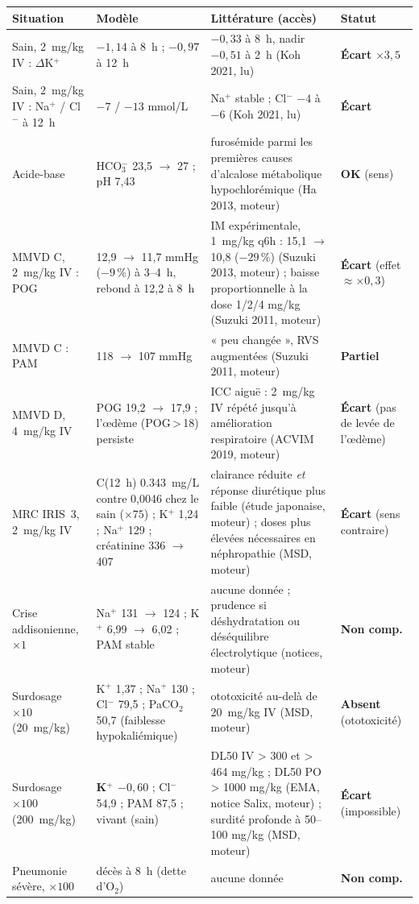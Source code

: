 \documentclass[10pt,a4paper]{article}
\newcommand{\ok}{\textcolor{green!45!black}{\textbf{OK}}}
\newcommand{\ecart}{\textcolor{red!70!black}{\textbf{Écart}}}
\newcommand{\partiel}{\textcolor{orange!80!black}{\textbf{Partiel}}}
\newcommand{\nc}{\textcolor{black!60}{\textbf{Non comp.}}}
\newcommand{\absent}{\textcolor{red!70!black}{\textbf{Absent}}}
\begin{document}
\begin{tabularx}{\linewidth}{@{}P{3.4cm}P{4.3cm}LP{1.8cm}@{}}
\toprule
Situation & Modèle & Littérature (accès) & Statut\\
\midrule\endhead
Sain, \SI{2}{mg/kg} IV : $\Delta$K$^+$ & $-1{,}14$ à 8~h ; $-0{,}97$ à 12~h & $-0{,}33$ à 8~h, nadir $-0{,}51$ à 2~h (Koh 2021, lu) & \ecart{} $\times 3{,}5$\\
Sain, \SI{2}{mg/kg} IV : Na$^+$ / Cl$^-$ à 12~h & $-7$ / $-13$ mmol/L & Na$^+$ stable ; Cl$^-$ $-4$ à $-6$ (Koh 2021, lu) & \ecart{}\\
Acide-base & HCO$_3^-$ 23,5 $\rightarrow$ 27 ; pH 7,43 & furosémide parmi les premières causes d'alcalose métabolique hypochlorémique (Ha 2013, moteur) & \ok{} (sens)\\
MMVD C, \SI{2}{mg/kg} IV : POG & 12,9 $\rightarrow$ 11,7 mmHg ($-9$\,\%) à 3--4~h, rebond à 12,2 à 8~h & IM expérimentale, 1~mg/kg q6h : 15,1 $\rightarrow$ 10,8 ($-29$\,\%) (Suzuki 2013, moteur) ; baisse proportionnelle à la dose 1/2/4 mg/kg (Suzuki 2011, moteur) & \ecart{} (effet $\approx\times 0{,}3$)\\
MMVD C : PAM & 118 $\rightarrow$ 107 mmHg & « peu changée », RVS augmentées (Suzuki 2011, moteur) & \partiel{}\\
MMVD D, \SI{4}{mg/kg} IV & POG 19,2 $\rightarrow$ 17,9 ; l'œdème (POG\,>\,18) persiste & ICC aiguë : 2~mg/kg IV répété jusqu'à amélioration respiratoire (ACVIM 2019, moteur) & \ecart{} (pas de levée de l'œdème)\\
MRC IRIS~3, \SI{2}{mg/kg} IV & C(12~h) \SI{0,343}{mg/L} contre 0,0046 chez le sain ($\times 75$) ; K$^+$ 1,24 ; Na$^+$ 129 ; créatinine 336 $\rightarrow$ 407 & clairance réduite \emph{et} réponse diurétique plus faible (étude japonaise, moteur) ; doses plus élevées nécessaires en néphropathie (MSD, moteur) & \ecart{} (sens contraire)\\
Crise addisonienne, $\times 1$ & Na$^+$ 131 $\rightarrow$ 124 ; K$^+$ 6,99 $\rightarrow$ 6,02 ; PAM stable & aucune donnée ; prudence si déshydratation ou déséquilibre électrolytique (notices, moteur) & \nc{}\\
Surdosage $\times 10$ (\SI{20}{mg/kg}) & K$^+$ 1,37 ; Na$^+$ 130 ; Cl$^-$ 79,5 ; PaCO$_2$ 50,7 (faiblesse hypokaliémique) & ototoxicité au-delà de 20~mg/kg IV (MSD, moteur) & \absent{} (ototoxicité)\\
Surdosage $\times 100$ (\SI{200}{mg/kg}) & \textbf{K$^+$ $-0{,}60$} ; Cl$^-$ 54,9 ; PAM 87,5 ; vivant (sain) & DL50 IV > 300 et > 464 mg/kg ; DL50 PO > 1000 mg/kg (EMA, notice Salix, moteur) ; surdité profonde à 50--100 mg/kg (MSD, moteur) & \ecart{} (impossible)\\
Pneumonie sévère, $\times 100$ & décès à 8~h (dette d'O$_2$) & aucune donnée & \nc{}\\
\bottomrule
\end{tabularx}
\end{document}
